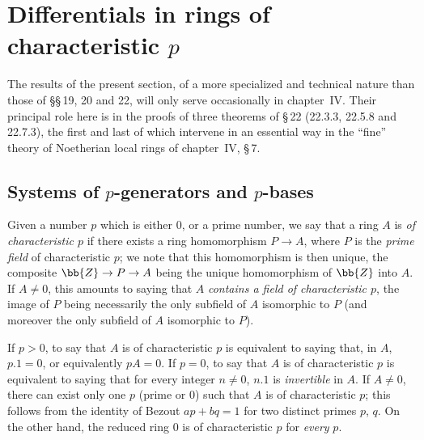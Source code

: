 \section{Differentials in rings of characteristic \texorpdfstring{$p$}{p}}
\label{section:0.21}
\label{0.21}

The results of the present section, of a more specialized and technical nature than those of \S\S\,19, 20 and 22, will only serve occasionally in chapter~IV.
Their principal role here is in the proofs of three theorems of \S\,22 (22.3.3, 22.5.8 and 22.7.3), the first and last of which intervene in an essential way in the ``fine'' theory of Noetherian local rings of chapter~IV, \S\,7.

\subsection{Systems of \texorpdfstring{$p$}{p}-generators and \texorpdfstring{$p$}{p}-bases}
\label{subsection:0.21.1}

\begin{env}[21.1.1]
\label{0.21.1.1}
Given a number $p$ which is either $0$, or a prime number, we say that a ring $A$ is \emph{of characteristic $p$} if there exists a ring homomorphism $P\to A$, where $P$ is the \emph{prime field} of characteristic $p$; we note that this homomorphism is then unique, the composite $\bb{Z}\to P\to A$ being the unique homomorphism of $\bb{Z}$ into $A$.
If $A\neq 0$, this amounts to saying that $A$ \emph{contains a field of characteristic $p$}, the image of $P$ being necessarily the only subfield of $A$ isomorphic to $P$ (and moreover the only subfield of $A$ isomorphic to $P$).
\end{env}

\begin{env}[21.1.2]
\label{0.21.1.2}
If $p>0$, to say that $A$ is of characteristic $p$ is equivalent to saying that, in $A$, $p.1=0$, or equivalently $pA=0$.
If $p=0$, to say that $A$ is of characteristic $p$ is equivalent to saying that for every integer $n\neq 0$, $n.1$ is \emph{invertible} in $A$.
If $A\neq 0$, there can exist only one $p$ (prime or $0$) such that $A$ is of characteristic $p$; this follows from the identity of Bezout $ap+bq=1$ for two distinct primes $p$, $q$.
On the other hand, the reduced ring $0$ is of characteristic $p$ for \emph{every} $p$.
\end{env}

